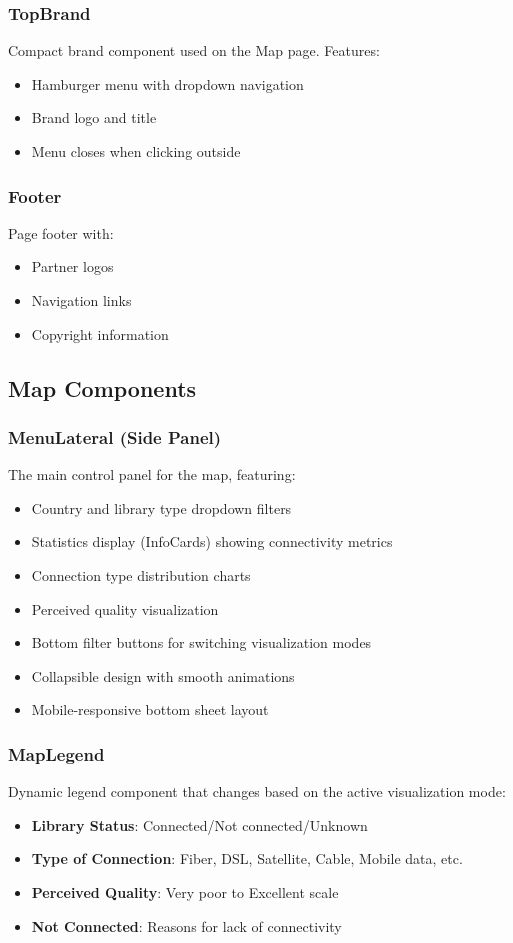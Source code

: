 \documentclass[11pt,a4paper]{article}
\begin{document}
\subsubsection{TopBrand}
Compact brand component used on the Map page. Features:
\begin{itemize}
    \item Hamburger menu with dropdown navigation
    \item Brand logo and title
    \item Menu closes when clicking outside
\end{itemize}

\subsubsection{Footer}
Page footer with:
\begin{itemize}
    \item Partner logos
    \item Navigation links
    \item Copyright information
\end{itemize}

\subsection{Map Components}

\subsubsection{MenuLateral (Side Panel)}
The main control panel for the map, featuring:
\begin{itemize}
    \item Country and library type dropdown filters
    \item Statistics display (InfoCards) showing connectivity metrics
    \item Connection type distribution charts
    \item Perceived quality visualization
    \item Bottom filter buttons for switching visualization modes
    \item Collapsible design with smooth animations
    \item Mobile-responsive bottom sheet layout
\end{itemize}

\subsubsection{MapLegend}
Dynamic legend component that changes based on the active visualization mode:
\begin{itemize}
    \item \textbf{Library Status}: Connected/Not connected/Unknown
    \item \textbf{Type of Connection}: Fiber, DSL, Satellite, Cable, Mobile data, etc.
    \item \textbf{Perceived Quality}: Very poor to Excellent scale
    \item \textbf{Not Connected}: Reasons for lack of connectivity
\end{itemize}
\end{document}
